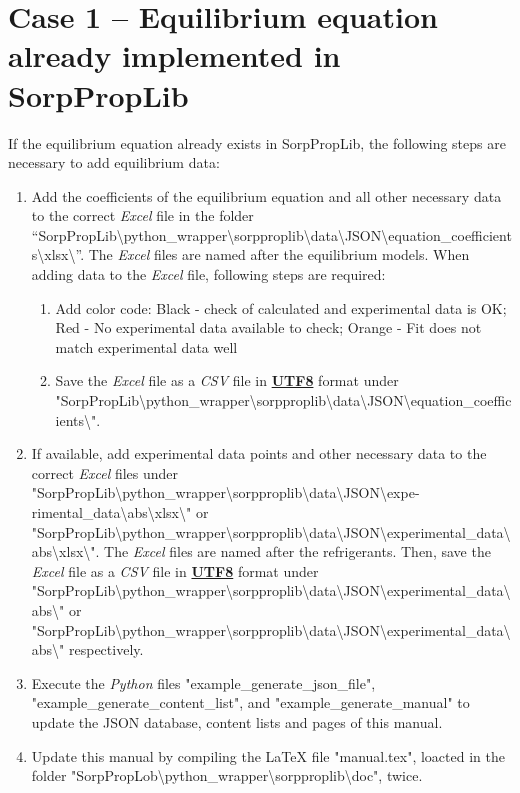 \section{Case 1 – Equilibrium equation already implemented in SorpPropLib}
\label{cha:extensions:case1}
%
If the equilibrium equation already exists in SorpPropLib, the following steps are necessary to add equilibrium data:
\begin{enumerate}
	\item Add the coefficients of the equilibrium equation and all other necessary data to the correct \textit{Excel} file in the folder “SorpPropLib\textbackslash python\_wrapper\textbackslash sorpproplib\textbackslash \newline data\textbackslash JSON\textbackslash equation\_coefficients\textbackslash xlsx\textbackslash ”. The \textit{Excel} files are named after the equilibrium models. When adding data to the \textit{Excel} file, following steps are required:
	\begin{enumerate}
		\item Add color code: Black - check of calculated and experimental data is OK; Red - No experimental data available to check; Orange - Fit does not match experimental data well
		\item Save the \textit{Excel} file as a \textit{CSV} file in \textbf{\underline{UTF8}} format under "SorpPropLib\textbackslash python\_wrapper\textbackslash sorpproplib\textbackslash data\textbackslash JSON\textbackslash equation\_coefficients\textbackslash".
	\end{enumerate}
	\item If available, add experimental data points and other necessary data to the correct \textit{Excel} files under "SorpPropLib\textbackslash python\_wrapper\textbackslash sorpproplib\textbackslash data\textbackslash JSON\textbackslash expe-rimental\_data\textbackslash abs\textbackslash xlsx\textbackslash " or "SorpPropLib\textbackslash python\_wrapper\textbackslash sorpproplib\textbackslash data\textbackslash \newline JSON\textbackslash experimental\_data\textbackslash abs\textbackslash xlsx\textbackslash". The \textit{Excel} files are named after the refrigerants. Then, save the \textit{Excel} file as a \textit{CSV} file in \textbf{\underline{UTF8}} format under "SorpPropLib\textbackslash python\_wrapper\textbackslash sorpproplib\textbackslash data\textbackslash JSON\textbackslash experimental\_data\textbackslash abs\textbackslash " or "SorpPropLib\textbackslash python\_wrapper\textbackslash sorpproplib\textbackslash data\textbackslash JSON\textbackslash experimental\_data\textbackslash\newline abs\textbackslash " respectively.
	\item Execute the \textit{Python} files "example\_generate\_json\_file", "example\_generate\_\newline content\_list", and "example\_generate\_manual" to update the JSON database, content lists and pages of this manual.
	\item Update this manual by compiling the LaTeX file "manual.tex", loacted in the folder "SorpPropLob\textbackslash python\_wrapper\textbackslash sorpproplib\textbackslash doc", twice.
\end{enumerate}
